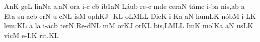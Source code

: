 \bigskip


\Internote
\nosolesmescustos
\initiumgregorianum
{}%
\sgn {}An\punctum K\egn
\sgn ge{}\punctum L\egn
\spatium
\sgn lin\pes Na\egn
{}a{,}\clivis aN\egn
\spatium
{}or\punctum a\egn
\sgn {}i-\ngl{}\punctum c\egn
{}\clivis cb\egn
\sgn {}i{}\episem b1\clivis aN\egn
\spatium
\divisiominima
\spatium
\sgn L{\'a}u\punctum b\egn
\sgn re-\punctum c\egn
{}m\pes de\egn
\spatium
\sgn cer\clivis aN\egn
\sgn t{\'a}m\punctum c\egn
\sgn {}i-\clivis ba\egn
\sgn ni{s,}\punctum a\augmentum b\egn
\spatium
\divisiomaior
\spatium
\custos a
\lineaproxima
\sgn {}Et\punctum a\egn
\spatium
\sgn su-\torculus acb\egn
{}er\punctum N\egn
\spatium
{}u{-c}\clivis NL\egn
\sgn {}is\punctum M\egn
\spatium
{}o{ph}\clivis KJ\egn
\sgn {}{\'\ae}-\pes KL\egn
\sgn {}o{}\torculus LML\augmentum L\egn
\spatium
\divisiominima
\spatium
\sgn Dic\punctum K\egn
\spatium
{}i-\pes Ka\egn
{}\clivis aN\egn
\sgn hum\clivis LK\egn
\spatium
\sgn n{\'o}b\punctum M\egn
\sgn {}i-\clivis LK\egn
\sgn le{m:}\punctum K\augmentum L\egn
\spatium
\divisiomaior
\spatium
\custos a
\lineaproxima
{}l\punctum a\egn
\sgn {}i-\torculus acb\egn
\sgn ter\punctum N\egn
\spatium
\sgn Re{-d}\clivis NL\egn
{}m\punctum M\egn
{}or\clivis KJ\egn
\spatium
\sgn {}or\pes KL\egn
\sgn bi{s,}\torculus LML\augmentum L\egn
\spatium
\divisiominima
\spatium
\sgn {}Im\punctum K\egn
\sgn mol\pes Ka\egn
{}\clivis aN\egn
\sgn {}us\clivis LK\egn
\spatium
\sgn v{\'\i}c\punctum M\egn
\sgn {}e-\clivis LK\egn
\sgn ri{t.}\punctum K\augmentum L\egn
\spatium
\Finisgregoriana

\bigskip

\beginlyrics

